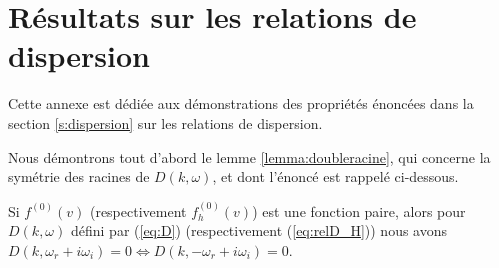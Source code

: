 
\section{Résultats sur les relations de dispersion}
\label{a:dispersion}

Cette annexe est dédiée aux démonstrations des propriétés énoncées dans la section \ref{s:dispersion} sur les relations de dispersion.

Nous démontrons tout d'abord le lemme \ref{lemma:doubleracine}, qui concerne la symétrie des racines de $D(k,\omega)$, et dont l'énoncé est rappelé ci-dessous.
\begin{lemma}
  Si $f^{(0)}(v)$ (respectivement $f_h^{(0)}(v)$) est une fonction paire, alors pour $D(k,\omega)$ défini par (\ref{eq:D}) (respectivement (\ref{eq:relD_H})) nous avons $D(k,\omega_r+i\omega_i) = 0 \Leftrightarrow D(k,-\omega_r+i\omega_i)=0$.
\end{lemma}

